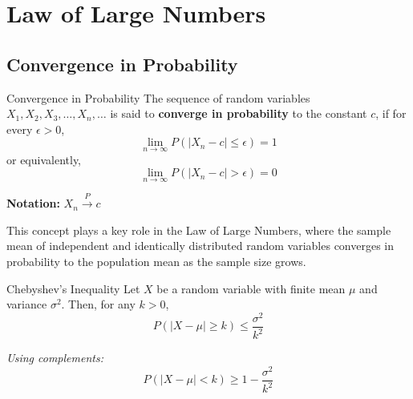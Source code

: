 \chapter{Law of Large Numbers}
\section{Convergence in Probability}

\begin{definitionbox}{Convergence in Probability}
The sequence of random variables \( X_1, X_2, X_3, \ldots, X_n, \ldots \) is said to \textbf{converge in probability} to the constant \( c \), if for every \( \epsilon > 0 \),
\[
\lim_{n \to \infty} P\left( |X_n - c| \leq \epsilon \right) = 1
\]
or equivalently,
\[
\lim_{n \to \infty} P\left( |X_n - c| > \epsilon \right) = 0
\]

\noindent \textbf{Notation:} \( X_n \xrightarrow{P} c \)
\end{definitionbox}


This concept plays a key role in the Law of Large Numbers, where the sample mean of independent and identically distributed random variables converges in probability to the population mean as the sample size grows.
\begin{definitionbox}{Chebyshev's Inequality}
Let \( X \) be a random variable with finite mean \( \mu \) and variance \( \sigma^2 \). Then, for any \( k > 0 \),
\[
P\left( |X - \mu| \geq k \right) \leq \frac{\sigma^2}{k^2}
\]

\textit{Using complements:}
\[
P\left( |X - \mu| < k \right) \geq 1 - \frac{\sigma^2}{k^2}
\]
\end{definitionbox}
